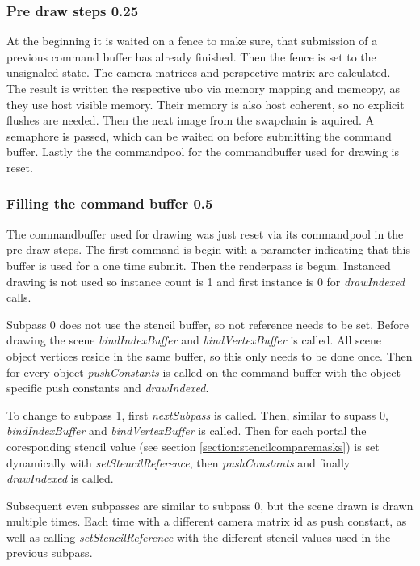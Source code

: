 \subsubsection{Pre draw steps 0.25}

At the beginning it is waited on a fence to make sure, that submission of a previous command buffer has already finished. Then the fence is set to the unsignaled state. The camera matrices and perspective matrix are calculated. The result is written the respective \gls{ubo} via memory mapping and memcopy, as they use host visible memory. Their memory is also host coherent, so no explicit flushes are needed.
Then the next image from the swapchain is aquired. A semaphore is passed, which can be waited on before submitting the command buffer.
Lastly the the commandpool for the commandbuffer used for drawing is reset.

\subsubsection{Filling the command buffer 0.5}
The commandbuffer used for drawing was just reset via its commandpool in the pre draw steps. The first command is begin with a parameter indicating that this buffer is used for a one time submit. Then the renderpass is begun. Instanced drawing is not used so instance count is 1 and first instance is 0 for \textit{drawIndexed} calls.

Subpass 0 does not use the stencil buffer, so not reference needs to be set. Before drawing the scene \textit{bindIndexBuffer} and \textit{bindVertexBuffer} is called. All scene object vertices reside in the same buffer, so this only needs to be done once. Then for every object \textit{pushConstants} is called on the command buffer with the object specific push constants and \textit{drawIndexed}. 

To change to subpass 1, first \textit{nextSubpass} is called. Then, similar to supass 0, \textit{bindIndexBuffer} and \textit{bindVertexBuffer} is called.  Then for each portal the coresponding stencil value (see section \ref{section:stencilcomparemasks}) is set dynamically with \textit{setStencilReference}, then \textit{pushConstants} and finally \textit{drawIndexed} is called.

Subsequent even subpasses are similar to subpass 0, but the scene drawn is drawn multiple times. Each time with a different camera matrix id as push constant, as well as calling \textit{setStencilReference} with the different stencil values used in the previous subpass.

